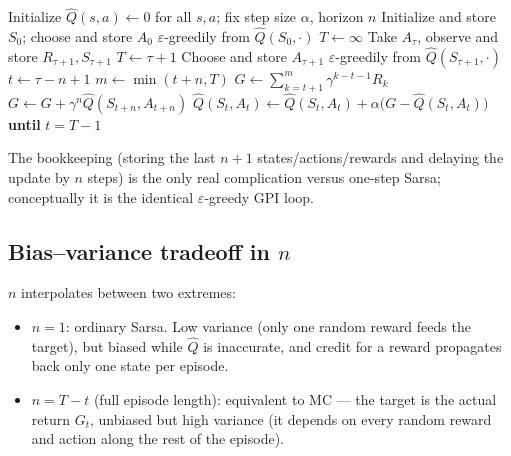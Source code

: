 \documentclass[11pt]{article}
\begin{document}
\begin{algorithm}[h]
\caption{$n$-step Sarsa (on-policy)}
\begin{algorithmic}[1]
\State Initialize $\hat{Q}(s,a) \leftarrow 0$ for all $s,a$; fix step size $\alpha$, horizon $n$
    \State Initialize and store $S_0$; choose and store $A_0$ $\varepsilon$-greedily from $\hat{Q}(S_0, \cdot)$
    \State $T \leftarrow \infty$
            \State Take $A_\tau$, observe and store $R_{\tau+1}, S_{\tau+1}$
                \State $T \leftarrow \tau + 1$
            \Else
                \State Choose and store $A_{\tau+1}$ $\varepsilon$-greedily from $\hat{Q}(S_{\tau+1}, \cdot)$
            \EndIf
        \EndIf
        \State $t \leftarrow \tau - n + 1$ 
            \State $m \leftarrow \min(t+n, T)$
            \State $G \leftarrow \sum_{k=t+1}^{m} \gamma^{k-t-1} R_k$
                \State $G \leftarrow G + \gamma^n \hat{Q}(S_{t+n}, A_{t+n})$
            \EndIf
            \State $\hat{Q}(S_t, A_t) \leftarrow \hat{Q}(S_t, A_t) + \alpha \big( G - \hat{Q}(S_t, A_t) \big)$
        \EndIf
    \EndFor
    \State \textbf{until} $t = T - 1$
\EndFor
\end{algorithmic}
\end{algorithm}

The bookkeeping (storing the last $n{+}1$ states/actions/rewards and
delaying the update by $n$ steps) is the only real complication versus
one-step Sarsa; conceptually it is the identical $\varepsilon$-greedy GPI
loop.

\subsection{Bias--variance tradeoff in $n$}

$n$ interpolates between two extremes:

\begin{itemize}
    \item $n = 1$: ordinary Sarsa. Low variance (only one random reward
        feeds the target), but biased while $\hat{Q}$ is inaccurate, and
        credit for a reward propagates back only one state per episode.
    \item $n = T - t$ (full episode length): equivalent to MC — the target
        is the actual return $G_t$, unbiased but high variance (it depends
        on every random reward and action along the rest of the episode).
\end{itemize}
\end{document}

